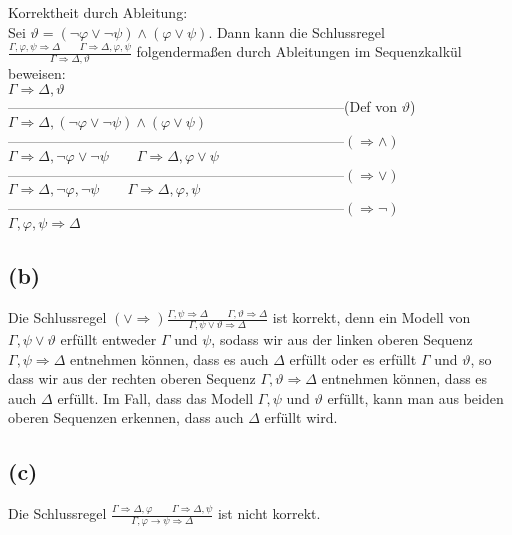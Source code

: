 \documentclass[11pt, a4paper]{article}
\renewcommand{\v}{\vee}
\newcommand{\n}{\wedge}
\begin{document}
Korrektheit durch Ableitung:\\
Sei $\vartheta = (\neg \varphi \v \neg\psi) \n (\varphi \v \psi)$. Dann kann die Schlussregel $\frac{\Gamma, \varphi,\psi \Rightarrow \Delta \qquad \Gamma \Rightarrow \Delta, \varphi, \psi}{\Gamma \Rightarrow \Delta, \vartheta}$ folgendermaßen durch Ableitungen im Sequenzkalkül beweisen:\\


$\Gamma \Rightarrow \Delta, \vartheta$\\
------------------------------------------------------------------------(Def von $\vartheta$)\\
$\Gamma \Rightarrow \Delta, (\neg \varphi \v \neg \psi) \n (\varphi \v \psi)$ \\
------------------------------------------------------------------------$(\Rightarrow \n)$\\
$\Gamma \Rightarrow \Delta, \neg \varphi \v \neg \psi \qquad \Gamma \Rightarrow \Delta, \varphi \v \psi$\\
------------------------------------------------------------------------$(\Rightarrow \v)$\\
$\Gamma \Rightarrow \Delta, \neg \varphi, \neg \psi \qquad \Gamma \Rightarrow \Delta, \varphi, \psi$\\
------------------------------------------------------------------------$(\Rightarrow \neg)$\\
$\Gamma, \varphi, \psi \Rightarrow \Delta$\\


\subsection*{(b)}
Die Schlussregel $(\v \Rightarrow) \frac{\Gamma, \psi \Rightarrow \Delta \qquad \Gamma, \vartheta \Rightarrow \Delta}{\Gamma, \psi \v \vartheta \Rightarrow \Delta}$ ist korrekt, denn ein Modell von $\Gamma, \psi \v \vartheta$ erfüllt entweder $\Gamma$ und $\psi$, sodass wir aus der linken oberen Sequenz $\Gamma, \psi \Rightarrow \Delta$ entnehmen können,
dass es auch $\Delta$ erfüllt oder es erfüllt $\Gamma$ und $\vartheta$, so dass wir aus der rechten oberen Sequenz $\Gamma, \vartheta \Rightarrow \Delta$ entnehmen können, dass es auch $\Delta$ erfüllt.
Im Fall, dass das Modell $\Gamma, \psi$ und $\vartheta$ erfüllt, kann man aus beiden oberen Sequenzen erkennen, dass auch $\Delta$ erfüllt wird.

\subsection*{(c)}
Die Schlussregel $\frac{\Gamma \Rightarrow \Delta, \varphi \qquad \Gamma \Rightarrow \Delta, \psi}{\Gamma, \varphi \rightarrow \psi \Rightarrow \Delta}$ ist nicht korrekt.
\end{document}
